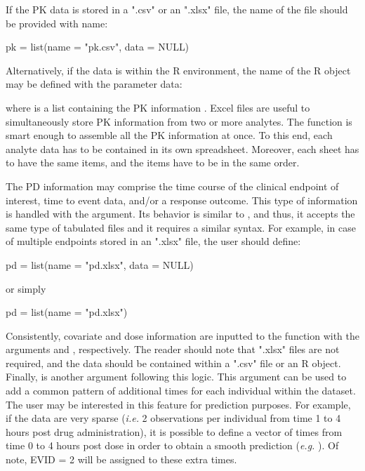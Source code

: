 If the PK data is stored in a ".csv" or an ".xlsx" file, the name of the file should be provided with name:
\begin{example}
pk = list(name = "pk.csv", data = NULL) 
\end{example}

Alternatively, if the data is within the R environment, the name of the R object may be defined with the parameter data: 

where  is a list containing the PK information . Excel files are useful to simultaneously store PK information from two or more analytes. The   function is smart enough to assemble all the PK information at once. To this end, each analyte data has to be contained in its own spreadsheet. Moreover, each sheet has to have the same items, and the items have to be in the same order. 


The PD information may comprise the time course of the clinical endpoint of interest, time to event data, and/or a response outcome. This type of information is handled with the  argument. Its behavior is similar to , and thus, it accepts the same type of tabulated files and it requires a similar syntax. For example, in case of multiple endpoints stored in an ".xlsx" file, the user should define: 
\begin{example}
pd = list(name = "pd.xlsx", data = NULL)  
\end{example} 
or simply
\begin{example}
pd = list(name = "pd.xlsx")
\end{example}

Consistently, covariate and dose information are inputted to the  function with the arguments  and , respectively. The reader should note that ".xlsx" files are not required, and the data should be contained within a ".csv" file or an R object. Finally,  is another argument following this logic. This argument can be used to add a common pattern of additional times for each individual within the dataset. The user may be interested in this feature for prediction purposes. For example, if the data are very sparse (\textit{i.e.} 2 observations per individual from time 1 to 4 hours post drug administration), it is possible to define a vector of times from time 0 to 4 hours post dose in order to obtain a smooth prediction (\textit{e.g.}  ). Of note, EVID = 2 will be assigned to these extra times.

